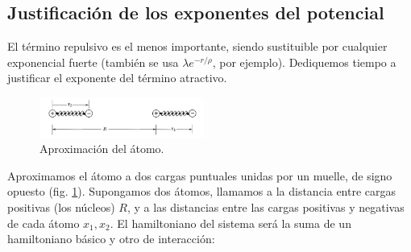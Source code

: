 \subsection{Justificación de los exponentes del potencial}
El término repulsivo es el menos importante, siendo sustituible por
cualquier exponencial fuerte (también se usa $\lambda e^{-r/\rho}$,
por ejemplo).  Dediquemos tiempo a justificar el exponente del término
atractivo.


\begin{figure}
  \centering
  \includegraphics[width=0.48\textwidth]{figures/quantumlj.jpg}
  \caption{Aproximación del átomo.}
  \label{fig:quantumlj}
\end{figure}

Aproximamos el átomo a dos cargas puntuales unidas por un muelle, de
signo opuesto (fig. \ref{fig:quantumlj}).
Supongamos dos átomos, llamamos a la distancia entre
cargas positivas (los núcleos) $R$, y a las distancias entre las
cargas positivas y negativas de cada átomo $x_1, x_2$. El hamiltoniano
del sistema será la suma de un hamiltoniano básico y otro de
interacción:

